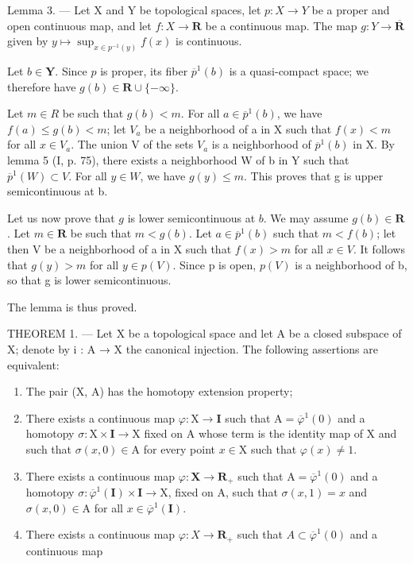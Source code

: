 Lemma 3. --- Let X and Y be topological spaces, let \(p \colon X \to Y\) be a proper and open continuous map, and let \(f \colon X \to \mathbf{R}\) be a continuous map. The map \(g \colon Y \to \overline{\mathbf{R}}\) given by \(y \mapsto \sup_{x\in p^{-1}(y)} f(x)\) is continuous.

Let \(b \in \mathbf{Y}\). Since \(p\) is proper, its fiber \(\overline{p}^1(b)\) is a quasi-compact space; we therefore have \(g(b) \in \mathbf{R} \cup \{-\infty\}\).

Let \(m \in R\) be such that \(g(b) < m\). For all \(a \in \overline{p}^{1}(b)\), we have \(f(a) \leqslant g(b) < m\); let \(V_{a}\) be a neighborhood of a in X such that \(f(x) < m\) for all \(x \in V_{a}\). The union V of the sets \(V_{a}\) is a neighborhood of \(\overline{p}^{1}(b)\) in X. By lemma 5 (I, p. 75), there exists a neighborhood W of b in Y such that \(\overline{p}^{1}(W) \subset V\). For all \(y \in W\), we have \(g(y) \leqslant m\). This proves that g is upper semicontinuous at b.

Let us now prove that \(g\) is lower semicontinuous at \(b\). We may assume \(g(b)\in\mathbf{R}\). Let \(m\in\mathbf{R}\) be such that \(m<g(b)\). Let \(a\in\overline{p}^1(b)\) such that \(m<f(b)\); let then V be a neighborhood of a in X such that \(f(x)>m\) for all \(x\in V\). It follows that \(g(y)>m\) for all \(y\in p(V)\). Since p is open, \(p(V)\) is a neighborhood of b, so that g is lower semicontinuous.

The lemma is thus proved.

THEOREM 1. --- Let X be a topological space and let A be a closed subspace of X; denote by i : A → X the canonical injection. The following assertions are equivalent:

\begin{enumerate}
\def\labelenumi{(\roman{enumi})}
\item
  The pair (X, A) has the homotopy extension property;
\item
  There exists a continuous map \(\varphi\colon\mathrm{X}\to\mathbf{I}\) such that \(\mathrm{A}=\overline{\varphi}^{1}(0)\) and a homotopy \(\sigma\colon\mathrm{X}\times\mathbf{I}\to\mathrm{X}\) fixed on A whose term is the identity map of X and such that \(\sigma(x,0)\in\mathrm{A}\) for every point \(x\in\mathrm{X}\) such that \(\varphi(x)\neq1\).
\item
  There exists a continuous map \(\varphi\colon\mathbf{X}\to\mathbf{R}_{+}\) such that \(\mathrm{A}=\overline{\varphi}^{1}(0)\) and a homotopy \(\sigma\colon\overline{\varphi}^{1}(\mathbf{I})\times\mathbf{I}\to\mathrm{X}\), fixed on A, such that \(\sigma(x,1)=x\) and \(\sigma(x,0)\in\mathrm{A}\) for all \(x\in\overline{\varphi}^{1}(\mathbf{I})\).
\item
  There exists a continuous map \(\varphi\colon X\to\mathbf{R}_{+}\) such that \(A\subset\overline{\varphi}^{1}(0)\) and a continuous map
\end{enumerate}

